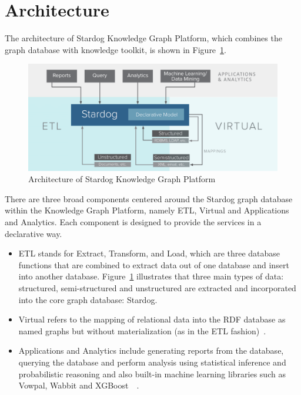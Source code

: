 \section{Architecture}
\label{s:arch}
	The architecture of Stardog Knowledge Graph Platform, which combines 
	the graph database with knowledge toolkit, is shown in 
	Figure~\ref{sa:archi}.

	\begin{figure}[!ht]
	  \centering\includegraphics[width=\columnwidth]{images/stardog-architecture.png}
	  \caption{Architecture of Stardog Knowledge Graph 
	  Platform~\cite{hid-sp18-405-blog-stardog-kgraph}}\label{sa:archi}
	\end{figure}

	There are three broad components centered around the Stardog graph 
	database within the Knowledge Graph Platform, namely ETL, Virtual and 
	Applications and Analytics. Each component is designed to provide 
	the services in a declarative way. 
	
	\begin{itemize}
		
		\item ETL stands for Extract, Transform, and Load, which are three 
		database functions that are combined to extract data out of one 
		database and insert into another database. Figure~\ref{sa:archi} 
		illustrates that three main types of data: structured, semi-structured 
		and unstructured are extracted and incorporated into the core graph 
		database: Stardog. 
		
		\item Virtual refers to the mapping of relational data into the RDF 
		database as named graphs but without materialization (as in the ETL 
		fashion)~\cite{hid-sp18-405-blog-stardog-virtual}. 
		
		\item Applications and Analytics include generating reports from the 
		database, querying the database and perform analysis using statistical 
		inference and probabilistic reasoning and also built-in machine learning 
		libraries such as Vowpal, Wabbit and 
		XGBoost~\cite{hid-sp18-405-blog-stardog-ml}~\cite{hid-sp18-405-blog-stardog-xgboost}.
	
\end{itemize}

